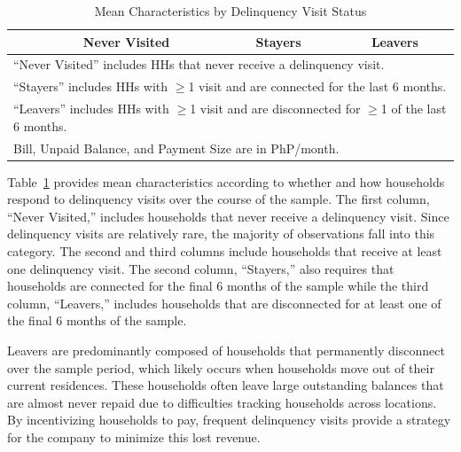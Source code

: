 \documentclass[12pt]{article}
\begin{document}
\begin{table}[h!]
\centering
\caption{Mean Characteristics by Delinquency Visit Status}\label{table:descriptives_3g}
\vspace{-2mm}
\begin{tabular}{l*{1}{ccc}}
\toprule
 & Never Visited & Stayers & Leavers  \\
\midrule

\bottomrule
\multicolumn{4}{l}{\scriptsize ``Never Visited'' includes HHs that never receive a delinquency visit.}\\  [-.5em]
\multicolumn{4}{l}{\scriptsize ``Stayers'' includes HHs with $\geq$1 visit and are connected for the last 6 months.}\\ [-.5em]
\multicolumn{4}{l}{\scriptsize ``Leavers'' includes HHs with $\geq$1 visit and are disconnected for $\geq$1 of the last 6 months.}\\ [-.5em]
\multicolumn{4}{l}{\scriptsize Bill, Unpaid Balance, and Payment Size are in PhP/month.} 
\end{tabular}
\end{table}


Table~\ref{table:descriptives_3g} provides mean characteristics according to whether and how households respond to delinquency visits over the course of the sample.  The first column, ``Never Visited,'' includes households that never receive a delinquency visit.  Since delinquency visits are relatively rare, the majority of observations fall into this category.  The second and third columns include households that receive at least one delinquency visit.   The second column, ``Stayers,'' also requires that households are connected for the final 6 months of the sample while the third column, ``Leavers,'' includes households that are disconnected for at least one of the final 6 months of the sample.  

Leavers are predominantly composed of households that permanently disconnect over the sample period, which likely occurs when households move out of their current residences.  These households often leave large outstanding balances that are almost never repaid due to difficulties tracking households across locations.  By incentivizing households to pay, frequent delinquency visits provide a strategy for the company to minimize this lost revenue.
\end{document}

